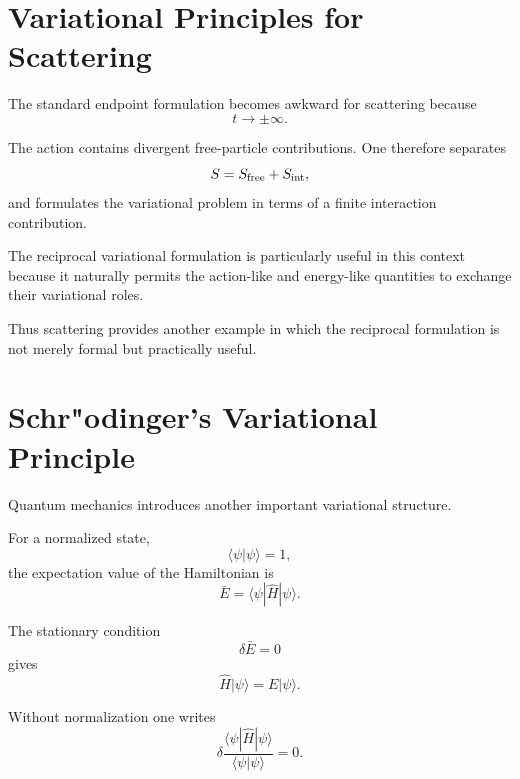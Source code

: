 \section{Variational Principles for Scattering}

The standard endpoint formulation becomes awkward for scattering because
\begin{equation}
t\rightarrow\pm\infty.
\end{equation}

The action contains divergent free-particle contributions.  One therefore separates
\begin{equation}
S
=
S_{\rm free}+S_{\rm int},
\end{equation}
and formulates the variational problem in terms of a finite interaction contribution.

The reciprocal variational formulation is particularly useful in this context because it naturally permits the action-like and energy-like quantities to exchange their variational roles.

Thus scattering provides another example in which the reciprocal formulation is not merely formal but practically useful.

\section{Schr"odinger's Variational Principle}

Quantum mechanics introduces another important variational structure.

For a normalized state,
\begin{equation}
\langle\psi|\psi\rangle=1,
\end{equation}
the expectation value of the Hamiltonian is
\begin{equation}
\bar E
=
\langle\psi|\hat H|\psi\rangle.
\end{equation}

The stationary condition
\begin{equation}
\boxed{
\delta\bar E=0
}
\end{equation}
gives
\begin{equation}
\hat H|\psi\rangle
=
E|\psi\rangle.
\end{equation}

Without normalization one writes
\begin{equation}
\boxed{
\delta
\frac{
\langle\psi|\hat H|\psi\rangle
}{
\langle\psi|\psi\rangle
}
=0.
}
\end{equation}

